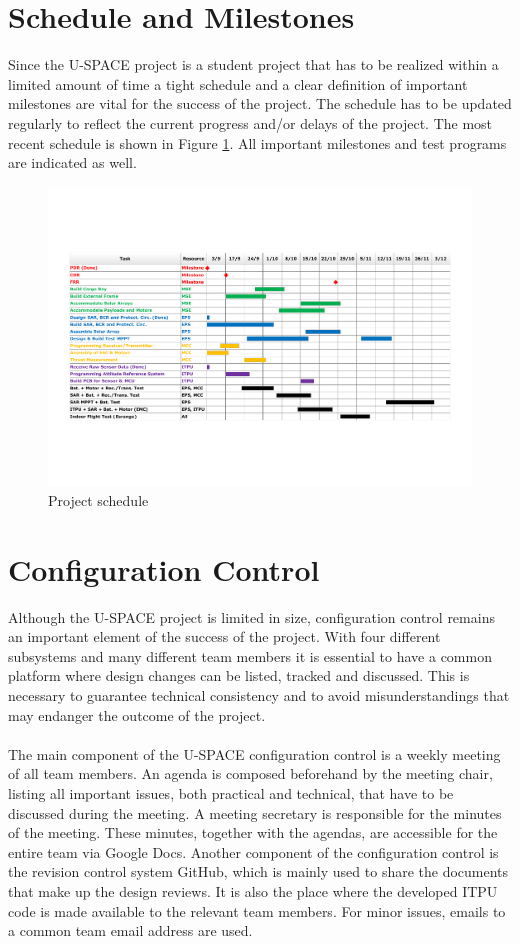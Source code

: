 \section{Schedule and Milestones}
\label{sec:schedule}
%
Since the \ac{U-SPACE} project is a student project that has to be realized within a limited amount of time a tight schedule and a clear definition of important milestones are vital for the success of the project. The schedule has to be updated regularly to reflect the current progress and/or delays of the project. The most recent schedule is shown in Figure \ref{fig:project_plan}. All important milestones and test programs are indicated as well.
%
\begin{figure}
\centering
\includegraphics[width=\textwidth]{figures/fig_CDR_PM_GanttChart}
\caption{Project schedule}
\label{fig:project_plan}
\end{figure}
%
%
\section{Configuration Control}
%
Although the \ac{U-SPACE} project is limited in size, configuration control remains an important element of the success of the project. With four different subsystems and many different team members it is essential to have a common platform where design changes can be listed, tracked and discussed. This is necessary to guarantee technical consistency and to avoid misunderstandings that may endanger the outcome of the project.
\\
\\
The main component of the \ac{U-SPACE} configuration control is a weekly meeting of all team members. An agenda is composed beforehand by the meeting chair, listing all important issues, both practical and technical, that have to be discussed during the meeting. A meeting secretary is responsible for the minutes of the meeting. These minutes, together with the agendas, are accessible for the entire team via Google Docs. Another component of the configuration control is the revision control system GitHub, which is mainly used to share the documents that make up the design reviews. It is also the place where the developed \ac{ITPU} code is made available to the relevant team members. For minor issues, emails to a common team email address are used.
%
